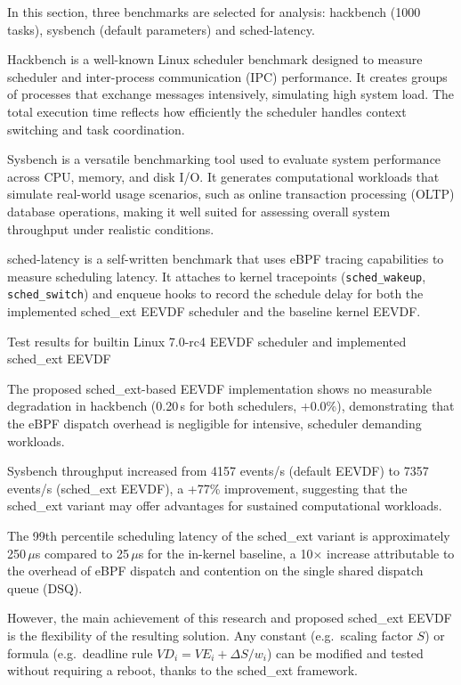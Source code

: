 \documentclass[a4paper]{article}
\begin{document}
\enlargethispage{-1\baselineskip}
In this section, three benchmarks are selected for analysis:
hackbench (1000 tasks), sysbench (default parameters) and sched-latency.

Hackbench is a well-known Linux scheduler benchmark designed to
measure scheduler and inter-process communication (IPC) performance.
It creates groups of processes that exchange messages intensively, simulating high system
load. The total execution time reflects how efficiently the scheduler handles
context switching and task coordination.

Sysbench is a versatile benchmarking tool used to evaluate system performance
across CPU, memory, and disk I/O. It generates computational workloads
that simulate real-world usage scenarios, such as
online transaction processing (OLTP) database operations, making it well
suited for assessing overall system throughput under realistic conditions.

sched-latency is a self-written benchmark that uses eBPF tracing capabilities
to measure scheduling latency. It attaches to kernel tracepoints (\verb|sched_wakeup|, \verb|sched_switch|) and enqueue hooks to record the schedule delay for both
the implemented sched\_ext EEVDF scheduler and the baseline kernel EEVDF.

{Test results for builtin Linux 7.0-rc4 EEVDF scheduler and
implemented sched\_ext EEVDF}


The proposed sched\_ext-based EEVDF implementation shows no measurable
degradation in hackbench (0.20\,s for both schedulers, +0.0\%), demonstrating
that the eBPF dispatch overhead is negligible for intensive, scheduler demanding workloads.

Sysbench throughput increased from 4157 events/s (default EEVDF) to
7357 events/s (sched\_ext EEVDF), a +77\% improvement, suggesting that
the sched\_ext variant may offer advantages for sustained computational workloads.

The 99th percentile scheduling latency of the sched\_ext variant is
approximately 250\,$ \mu $s compared to 25\,$ \mu $s for the in-kernel
baseline, a 10$ \times $ increase attributable to the overhead
of eBPF dispatch and contention on the single shared dispatch queue (DSQ).

However, the main achievement of this research and proposed sched\_ext EEVDF
is the flexibility of the resulting solution. Any constant (e.g.\ scaling factor $ S $)
or formula (e.g.\ deadline rule $ VD_i = VE_i + \Delta S / w_i $) can be modified and tested
without requiring a reboot, thanks to the sched\_ext framework.
\end{document}
